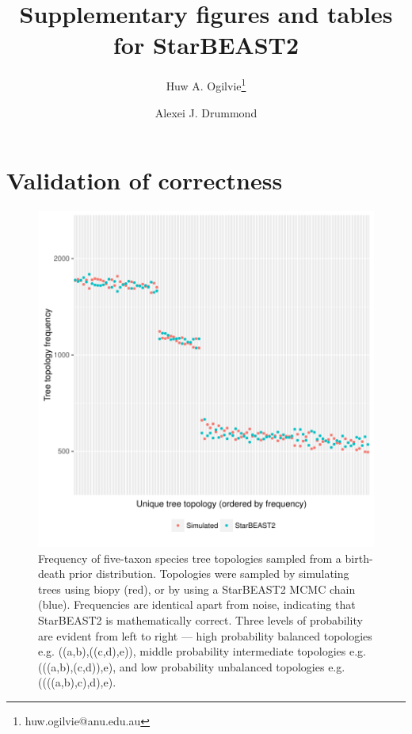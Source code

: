\documentclass[12pt]{article}
\begin{document}
\title{Supplementary figures and tables for StarBEAST2}
\author[1,2]{Huw A. Ogilvie\thanks{huw.ogilvie@anu.edu.au}}
\author[2,3]{Alexei J. Drummond}

\maketitle

\clearpage

\justifying

\section*{Validation of correctness}

\begin{figure}[htb!]
\centering
\includegraphics[width=16cm]{species_topology_frequencies.pdf}
\caption
{Frequency of five-taxon species tree topologies sampled from a birth-death prior
distribution. Topologies were sampled by simulating trees using biopy (red), or
by using a StarBEAST2 MCMC chain (blue). Frequencies are identical apart from
noise, indicating that StarBEAST2 is mathematically correct. Three levels of
probability are evident from left to right --- high probability balanced
topologies e.g. ((a,b),((c,d),e)), middle probability intermediate topologies
e.g. (((a,b),(c,d)),e), and low probability unbalanced topologies e.g.
((((a,b),c),d),e).}
\label{fig:speciesTopologyFrequencies}
\end{figure}
\end{document}
